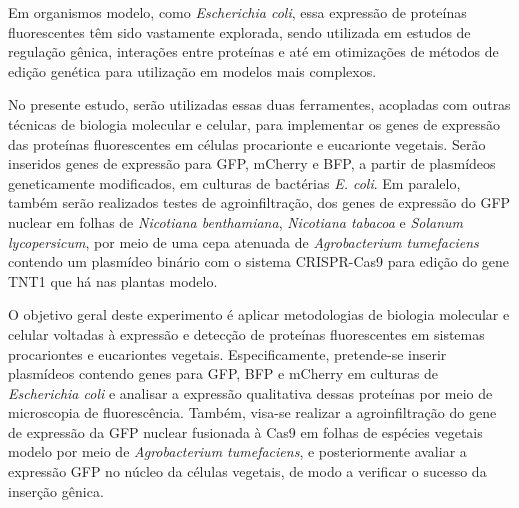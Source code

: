 Em organismos modelo, como \textit{Escherichia coli}, essa expressão de
proteínas fluorescentes têm sido vastamente explorada, sendo utilizada em
estudos de regulação gênica, interações entre proteínas e até em otimizações de
métodos de edição genética para utilização em modelos mais
complexos\cite{ruiz_silhavy_2022}. 

No presente estudo, serão utilizadas essas duas ferramentes, acopladas com
outras técnicas de biologia molecular e celular, para implementar os genes de
expressão das proteínas fluorescentes em células procarionte e eucarionte
vegetais. Serão inseridos genes de expressão para GFP, mCherry e BFP, a partir
de plasmídeos geneticamente modificados, em culturas de bactérias \textit{E.
coli}. Em paralelo, também serão realizados testes de agroinfiltração, dos genes
de expressão do GFP nuclear em folhas de \textit{Nicotiana benthamiana},
\textit{Nicotiana tabacoa} e \textit{Solanum lycopersicum}, por meio de uma cepa
atenuada de \textit{Agrobacterium tumefaciens} contendo um plasmídeo binário com
o sistema CRISPR-Cas9 para edição do gene TNT1 que há nas plantas
modelo\cite{hernández-pinzón_2012}.

O objetivo geral deste experimento é aplicar metodologias de biologia molecular
e celular voltadas à expressão e detecção de proteínas fluorescentes em sistemas
procariontes e eucariontes vegetais. Especificamente, pretende-se inserir
plasmídeos contendo genes para GFP, BFP e mCherry em culturas de
\textit{Escherichia coli}  e analisar a expressão qualitativa dessas proteínas
por meio de microscopia de fluorescência. Também, visa-se realizar a
agroinfiltração do gene de expressão da GFP nuclear fusionada à Cas9 em folhas
de espécies vegetais modelo por meio de \textit{Agrobacterium tumefaciens}, e
posteriormente avaliar a expressão GFP no núcleo da células vegetais, de modo a
verificar o sucesso da inserção gênica. 
